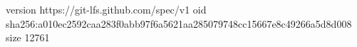 version https://git-lfs.github.com/spec/v1
oid sha256:a010ec2592caa283f0abb97f6a5621aa285079748cc15667e8c49266a5d8d008
size 12761
